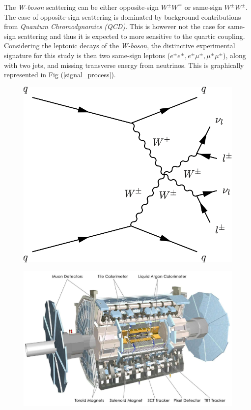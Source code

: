 \documentclass[a4paper]{jpconf}
\begin{document}
The \emph{W-boson} scattering can be either opposite-sign $W^{\pm}W^{\mp}$ or same-sign $W^{\pm}W^{\pm}$. The case of opposite-sign scattering is dominated by background contributions from \emph{Quantum Chromodynamics (QCD)}. This is however not the case for same-sign scattering and thus it is expected to more sensitive to the quartic coupling. Considering the leptonic decays of the \emph{W-boson}, the distinctive experimental signature for this study is then two same-sign leptons ($e^{\pm}e^{\pm},e^{\pm}\mu^{\pm},\mu^{\pm}\mu^{\pm}$), along with two jets, and missing transverse energy from neutrinos. This is graphically represented in Fig (\ref{signal_process}).
\begin{figure}[!tbp]
\centering
\begin{minipage}[b]{.4\textwidth}
  \centering
  \includegraphics[width=\textwidth]{signal.png}
  \label{signal_process}
\end{minipage}
\hfill
\begin{minipage}[b]{.55\textwidth}
  \centering
  \includegraphics[width=1\textwidth]{atlas.png}
  \label{atlas}
\end{minipage}
\end{figure}
\end{document}
